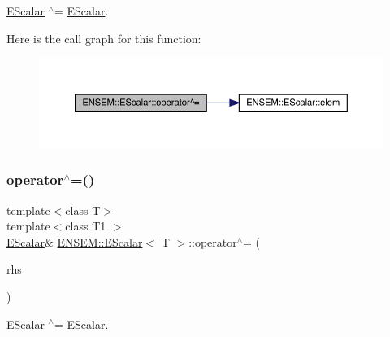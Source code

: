 \mbox{\hyperlink{classENSEM_1_1EScalar}{E\+Scalar}} $^\wedge$= \mbox{\hyperlink{classENSEM_1_1EScalar}{E\+Scalar}}. 

Here is the call graph for this function\+:
\nopagebreak
\begin{figure}[H]
\begin{center}
\leavevmode
\includegraphics[width=350pt]{d0/d82/classENSEM_1_1EScalar_a42c2a63d2eda81643ae8145068db3a8e_cgraph}
\end{center}
\end{figure}
\mbox{\label{classENSEM_1_1EScalar_a42c2a63d2eda81643ae8145068db3a8e}} 
\subsubsection{\texorpdfstring{operator$^\wedge$=()}{operator^=()}\hspace{0.1cm}{\footnotesize\ttfamily [2/2]}}
{\footnotesize\ttfamily template$<$class T$>$ \\
template$<$class T1 $>$ \\
\mbox{\hyperlink{classENSEM_1_1EScalar}{E\+Scalar}}\& \mbox{\hyperlink{classENSEM_1_1EScalar}{E\+N\+S\+E\+M\+::\+E\+Scalar}}$<$ T $>$\+::operator$^\wedge$= (\begin{DoxyParamCaption}\item[{const \mbox{\hyperlink{classENSEM_1_1EScalar}{E\+Scalar}}$<$ T1 $>$ \&}]{rhs }\end{DoxyParamCaption})\hspace{0.3cm}{\ttfamily [inline]}}



\mbox{\hyperlink{classENSEM_1_1EScalar}{E\+Scalar}} $^\wedge$= \mbox{\hyperlink{classENSEM_1_1EScalar}{E\+Scalar}}. 

